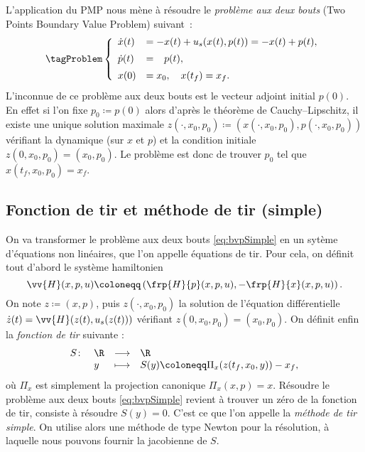 L'application du PMP nous m\`ene \`a r\'esoudre le \emph{probl\`eme aux deux bouts} (Two Points Boundary Value Problem) suivant~:
    \leqnomode
    \begin{equation}
    \tagProblem
        \left\{ 
            \begin{array}{ll}
                \dot{x}(t)  & = -x(t) + u_s(x(t),p(t)) = -x(t)+p(t),              \\[0.5em]
                \dot{p}(t)  & = \phantom{-}p(t),                                    \\[0.5em]
                x(0)        & = x_0, \quad x(t_f) = x_f.
            \end{array}
        \right. 
        \label{eq:bvpSimple}
    \end{equation}
    \reqnomode
    L'inconnue de ce probl\`eme aux deux bouts est le vecteur adjoint initial $p(0)$.
    En effet si l'on fixe $p_0 \coloneqq p(0)$ alors d'apr\`es le th\'eor\`eme de Cauchy--Lipschitz, il existe une unique solution maximale
    $z(\cdot, x_0, p_0)\coloneqq(x(\cdot, x_0, p_0),p(\cdot, x_0, p_0))$ v\'erifiant la dynamique (sur $x$ et $p$) et la condition initiale
    $z(0, x_0, p_0) = (x_0,p_0)$.
    Le probl\`eme est donc de trouver $p_0$ tel que $x(t_f, x_0, p_0) = x_f$.

\subsection{Fonction de tir et m\'ethode de tir (simple)}

    On va transformer le probl\`eme aux deux bouts \eqref{eq:bvpSimple} en un syt\`eme d'\'equations non lin\'eaires, que l'on appelle \'equations de tir.
    Pour cela, on d\'efinit tout d'abord le syst\`eme hamiltonien 
    \begin{equation*}
        \vv{H}(x,p,u) \coloneqq \left( \frp{H}{p}(x,p,u), -\frp{H}{x}(x,p,u) \right).
    \end{equation*}
    On note $z \coloneqq (x,p)$, puis $z(\cdot,x_0,p_0)$ la solution de l'\'equation diff\'erentielle $\dot{z}(t) = \vv{H}(z(t), u_s(z(t)))$
    v\'erifiant $z(0,x_0,p_0) = (x_0,p_0)$.
    On d\'efinit enfin la \emph{fonction de tir} suivante :
    \begin{equation}
        \begin{array}{rlll}
            S \colon    & \R    & \longrightarrow   & \R \\
                        & y     & \longmapsto       & S(y) \coloneqq \Pi_x(z(t_f,x_0,y)) - x_f,
        \end{array}
        \label{eq:fonctionDeTirSimple}
    \end{equation}
    o\`u $\Pi_x$ est simplement la projection canonique $\Pi_x(x,p) = x$.
    R\'esoudre le probl\`eme aux deux bouts \eqref{eq:bvpSimple} revient \`a trouver un z\'ero de la fonction de tir, 
    \ie consiste \`a r\'esoudre
    $S(y) = 0.$ C'est ce que l'on appelle 
    la \emph{m\'ethode de tir simple}. On utilise alors une m\'ethode 
    de type Newton pour la r\'esolution, \`a laquelle nous pouvons fournir la jacobienne de $S$.

